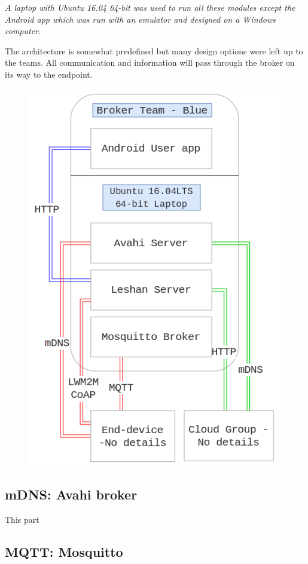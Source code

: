 \documentclass[conference]{IEEEtran}
\begin{document}
\textit{A laptop with Ubuntu 16.04 64-bit was used to run all these modules except the Android app which was run with an emulator and designed on a Windows computer.}

The architecture is somewhat predefined but many design options were left up to the teams. All communication and information will pass through the broker on its way to the endpoint.

\begin{figure}[h]
	\begin{center}
		\includegraphics[width=0.8\linewidth]{img/overview}
		\caption{}
		\label{fig:fig2}
	\end{center}
\end{figure}



\subsection{mDNS: Avahi broker}
This part 

\subsection{MQTT: Mosquitto}













\printbibliography
\end{document}
